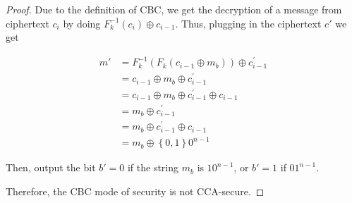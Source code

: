 \documentclass{article}
\begin{document}
\begin{enumerate}
\begin{proof}
      Due to the definition of CBC, we get the decryption of a message from
      ciphertext $c_i$ by doing $F_{k}^{-1}(c_i) \oplus c_{i - 1}$. Thus,
      plugging in the ciphertext $c'$ we get

      \begin{align*}
        m' &= F_{k}^{-1}(F_k(c_{i - 1} \oplus m_b)) \oplus c^{'}_{i - 1}\\
           &= c_{i - 1} \oplus m_b \oplus c^{'}_{i - 1}\\
           &= c_{i - 1} \oplus m_b \oplus c^{'}_{i - 1} \oplus c_{i - 1}\\
           &= m_b \oplus c^{'}_{i - 1}\\
           &= m_b \oplus c^{'}_{i - 1} \oplus c_{i - 1}\\
           &= m_b \oplus \left\{0, 1\right\}0^{n - 1}
      \end{align*}

      Then, output the bit $b' = 0$ if the string $m_b$ is $10^{n - 1}$, or $b'
      = 1$ if $01^{n - 1}$.

      Therefore, the CBC mode of security is not CCA-secure.
    \end{proof}
\end{enumerate}
\end{document}
